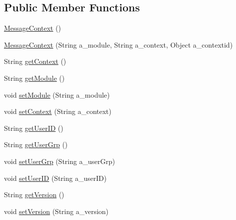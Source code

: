 \subsection*{Public Member Functions}
\begin{DoxyCompactItemize}
\item 
\hyperlink{classorg_1_1jgap_1_1distr_1_1grid_1_1_message_context_a8f68143ad261b3af4d63492ac335b902}{Message\-Context} ()
\item 
\hyperlink{classorg_1_1jgap_1_1distr_1_1grid_1_1_message_context_aaf4fe6e9a81c40fac6a4c3f572900c0b}{Message\-Context} (String a\-\_\-module, String a\-\_\-context, Object a\-\_\-contextid)
\item 
String \hyperlink{classorg_1_1jgap_1_1distr_1_1grid_1_1_message_context_a6a6e41f4e09e0d193a4a761dadad8200}{get\-Context} ()
\item 
String \hyperlink{classorg_1_1jgap_1_1distr_1_1grid_1_1_message_context_aed6ac965ff87b4e5fcbfcc706fff963d}{get\-Module} ()
\item 
void \hyperlink{classorg_1_1jgap_1_1distr_1_1grid_1_1_message_context_aa8a3835f6a594eb556453e7fd671a18c}{set\-Module} (String a\-\_\-module)
\item 
void \hyperlink{classorg_1_1jgap_1_1distr_1_1grid_1_1_message_context_a7a5c2ed20dfd0ffd580ebe3042078cd6}{set\-Context} (String a\-\_\-context)
\item 
String \hyperlink{classorg_1_1jgap_1_1distr_1_1grid_1_1_message_context_a9f0f533f8ff6308860f800385f37bdfa}{get\-User\-I\-D} ()
\item 
String \hyperlink{classorg_1_1jgap_1_1distr_1_1grid_1_1_message_context_a8987b1bd3258e88de66b1c55d82f9c79}{get\-User\-Grp} ()
\item 
void \hyperlink{classorg_1_1jgap_1_1distr_1_1grid_1_1_message_context_a958bf8581d5f06e52089e87b658fe7c2}{set\-User\-Grp} (String a\-\_\-user\-Grp)
\item 
void \hyperlink{classorg_1_1jgap_1_1distr_1_1grid_1_1_message_context_a4ca76673702534be6971642ca8353fdb}{set\-User\-I\-D} (String a\-\_\-user\-I\-D)
\item 
String \hyperlink{classorg_1_1jgap_1_1distr_1_1grid_1_1_message_context_a6aee4527d0b68371329aeb912998801b}{get\-Version} ()
\item 
void \hyperlink{classorg_1_1jgap_1_1distr_1_1grid_1_1_message_context_a65848d5031f4a1b93b3d11e7e36c11db}{set\-Version} (String a\-\_\-version)
\end{DoxyCompactItemize}
